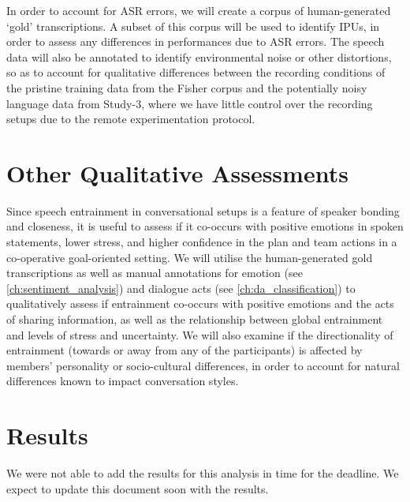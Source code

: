 In order to account for ASR errors, we will create a corpus of human-generated
`gold' transcriptions. A subset of this corpus will be used to
identify IPUs, in order to assess any differences in performances due to ASR
errors. The speech data will also be annotated to identify
environmental noise or other distortions, so as to account for qualitative differences
between the recording conditions of the pristine training data from the Fisher
corpus and the potentially noisy language data from Study-3, where we have
little control over the recording setups due to the remote experimentation
protocol.

\section{Other Qualitative Assessments}

Since speech entrainment in conversational setups is a feature of speaker
bonding and closeness, it is useful to assess if it co-occurs with positive
emotions in spoken statements, lower stress, and higher confidence in the plan
and team actions in a co-operative goal-oriented setting. We will utilise the
human-generated gold transcriptions as well as manual annotations for emotion
(see \autoref{ch:sentiment_analysis}) and dialogue acts (see
\autoref{ch:da_classification}) to qualitatively assess if entrainment
co-occurs with positive emotions and the acts of sharing information, as well
as the relationship between global entrainment and levels of stress and
uncertainty.  We will also examine if the directionality of entrainment
(towards or away from any of the participants) is affected by members'
personality or socio-cultural differences, in order to account for natural
differences known to impact conversation styles.

\section{Results}

We were not able to add the results for this analysis in time for the deadline.
We expect to update this document soon with the results.
